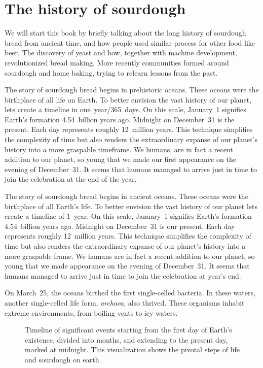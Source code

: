 \chapter{The history of sourdough}%
\label{ch:history}
\begin{quoting}
    We will start this book by briefly talking about the long history of
    sourdough bread from ancient time, and how people used similar process for
    other food like beer. The discovery of yeast and how, together with
    machine development, revolutionized bread making.  More recently
    communities formed around sourdough and home baking, trying to relearn
    lessons from the past.
\end{quoting}

The story of sourdough bread begins in prehistoric oceans. These oceans were the
birthplace of all life on Earth. To better envision the vast history of
our planet, lets create a timeline in one~year/365~days. On this scale,
January~1 signifies Earth's
formation 4.54~billion years ago. Midnight on December~31 is the present.
Each day represents roughly 12~million years. This technique simplifies the
complexity of time but also renders the extraordinary expanse of our planet's
history into a more graspable timeframe. We humans, are in fact a recent
addition to our planet, so young that we made our first appearance on
the evening of December~31.  It seems that humans managed to arrive just
in time to join the celebration at the end of the year.

The story of sourdough bread begins in ancient oceans. These oceans were the
birthplace of all Earth's life. To better envision the vast history of
our planet lets create a timeline of 1~year. On this scale, January~1 signifies Earth's
formation 4.54~billion years ago. Midnight on December~31 is our present.
Each day represents roughly 12~million years. This technique simplifies the
complexity of time but also renders the extraordinary expanse of our planet's
history into a more graspable frame. We humans are in fact a recent addition
to our planet, so young that we made appearance on the evening of December~31.
It seems that humans managed to arrive just in time to join
the celebration at year's end.

On March~25, the oceans birthed the first single-celled bacteria. In these
waters, another single-celled life form, \emph{archaea}, also thrived. These
organisms inhabit extreme environments, from boiling vents to icy waters.

\begin{figure}[!htb]
\begin{center}
  
  \caption[Sourdough microbiology timeline]{Timeline of significant events
    starting from the first day of Earth's existence,
    divided into months, and extending to the present day,
    marked at midnight. This visualization shows the pivotal steps
    of life and sourdough on earth.}%
\end{center}
\end{figure}

